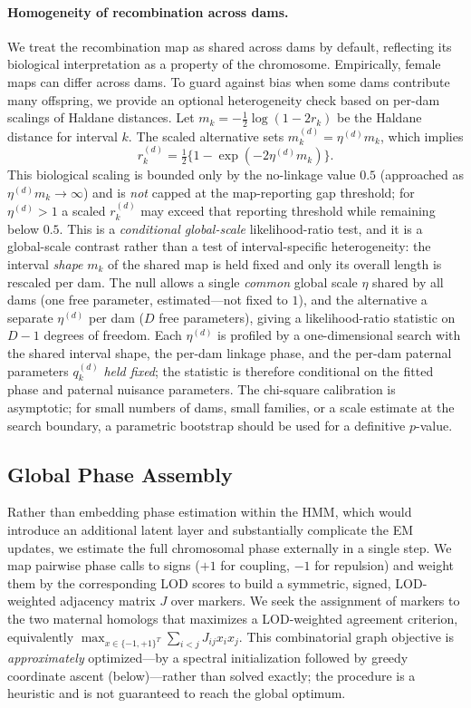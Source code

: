 \documentclass[11pt]{article}
\begin{document}
\paragraph{Homogeneity of recombination across dams.}
We treat the recombination map as shared across dams by default, reflecting its biological interpretation as a property of the chromosome. Empirically, female maps can differ across dams. To guard against bias when some dams contribute many offspring, we provide an optional heterogeneity check based on per-dam scalings of Haldane distances. Let $m_k=-\tfrac12\log(1-2r_k)$ be the Haldane distance for interval $k$. The scaled alternative sets $m_k^{(d)}=\eta^{(d)} m_k$, which implies
\[
r_k^{(d)}=\tfrac12\{1-\exp(-2\eta^{(d)} m_k)\}.
\]
This biological scaling is bounded only by the no-linkage value $0.5$ (approached as
$\eta^{(d)} m_k\to\infty$) and is \emph{not} capped at the map-reporting gap threshold; for
$\eta^{(d)}>1$ a scaled $r_k^{(d)}$ may exceed that reporting threshold while remaining below $0.5$.
This is a \emph{conditional global-scale} likelihood-ratio test, and it is a global-scale contrast rather than a test of interval-specific heterogeneity: the interval \emph{shape} $m_k$ of the shared map is held fixed and only its overall length is rescaled per dam. The null allows a single \emph{common} global scale $\eta$ shared by all dams (one free parameter, estimated---not fixed to $1$), and the alternative a separate $\eta^{(d)}$ per dam ($D$ free parameters), giving a likelihood-ratio statistic on $D-1$ degrees of freedom. Each $\eta^{(d)}$ is profiled by a one-dimensional search with the shared interval shape, the per-dam linkage phase, and the per-dam paternal parameters $q_k^{(d)}$ \emph{held fixed}; the statistic is therefore conditional on the fitted phase and paternal nuisance parameters. The chi-square calibration is asymptotic; for small numbers of dams, small families, or a scale estimate at the search boundary, a parametric bootstrap should be used for a definitive $p$-value.


\subsection{Global Phase Assembly}
\label{sec:global_phase_assembly}

Rather than embedding phase estimation within the HMM, which would introduce an additional latent layer and substantially complicate the EM updates, we estimate the full chromosomal phase externally in a single step. We map pairwise phase calls to signs (\(+1\) for coupling, \(-1\) for repulsion) and weight them by the corresponding LOD scores to build a symmetric, signed, LOD-weighted adjacency matrix \(J\) over markers. We seek the assignment of markers to the two maternal homologs that maximizes a LOD-weighted agreement criterion, equivalently \(\max_{x\in\{-1,+1\}^T} \sum_{i<j} J_{ij} x_i x_j\). This combinatorial graph objective is \emph{approximately} optimized---by a spectral initialization followed by greedy coordinate ascent (below)---rather than solved exactly; the procedure is a heuristic and is not guaranteed to reach the global optimum.
\end{document}

